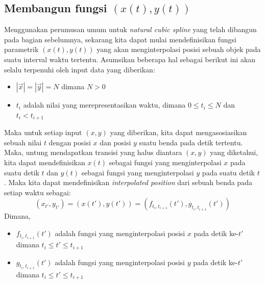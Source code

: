 \documentclass[journal,12pt,onecolumn,a4paper]{IEEEtran}
\begin{document}
\subsection{Membangun fungsi \((x(t), y(t))\)}
Menggunakan perumusan umum untuk \emph{natural cubic spline} yang telah dibangun pada bagian sebelumnya, sekarang kita dapat mulai mendefinisikan fungsi parametrik \((x(t), y(t))\) yang akan menginterpolasi posisi sebuah objek pada suatu interval waktu tertentu. Asumsikan beberapa hal sebagai berikut ini akan selalu terpenuhi oleh input data yang diberikan:
\begin{itemize}
	\item \(|\vec{x}| = |\vec{y}| = N\) dimana \(N > 0\)
	\item \(t_i\) adalah nilai yang merepresentasikan waktu, dimana \(0 \leq t_i \leq N\) dan \(t_i < t_{i+1}\)
\end{itemize}
Maka untuk setiap input \((x, y)\) yang diberikan, kita dapat mengasosiasikan sebuah nilai \(t\) dengan posisi \(x\) dan posisi \(y\) suatu benda pada detik tertentu. Maka, untung mendapatkan transisi yang halus diantara \((x, y)\) yang diketahui, kita dapat mendefinisikan \(x(t)\) sebagai fungsi yang menginterpolasi \(x\) pada suatu detik \(t\) dan \(y(t)\) sebagai fungsi yang menginterpolasi \(y\) pada suatu detik \(t\). Maka kita dapat mendefinisikan \emph{interpolated position} dari sebuah benda pada setiap waktu sebagai:
\begin{equation*}
	(x_{t'}, y_{t'}) = (x(t'), y(t')) = (f_{t_i, t_{i+1}}(t'), g_{t_i, t_{i+1}}(t'))
\end{equation*}
Dimana,
\begin{itemize}
	\item \(f_{t_i, t_{i+1}}(t')\) adalah fungsi yang menginterpolasi posisi \(x\) pada detik ke-\(t'\) dimana \(t_i \leq t' \leq t_{i+1}\)
	\item \(g_{t_i, t_{i+1}}(t')\) adalah fungsi yang menginterpolasi posisi \(y\) pada detik ke-\(t'\) dimana \(t_i \leq t' \leq t_{i+1}\)
\end{itemize}
\end{document}
